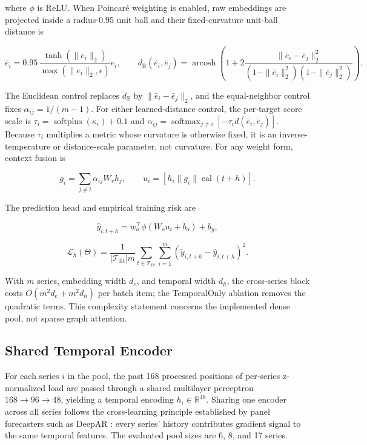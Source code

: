 \documentclass[electronics,article,submit,moreauthors]{Definitions/mdpi}
\begin{document}
where \(\phi\) is ReLU. When Poincar\'{e} weighting is enabled, raw embeddings are projected inside a radius-0.95 unit ball and their fixed-curvature unit-ball distance is

\[
\bar e_i=0.95\,\frac{\tanh(\|e_i\|_2)}{\max(\|e_i\|_2,\epsilon)}e_i,\qquad
d_{\mathbb B}(\bar e_i,\bar e_j)=
\operatorname{arcosh}\!\left(1+
2\frac{\|\bar e_i-\bar e_j\|_2^2}
{(1-\|\bar e_i\|_2^2)(1-\|\bar e_j\|_2^2)}\right).
\]

The Euclidean control replaces \(d_{\mathbb B}\) by \(\|\bar e_i-\bar e_j\|_2\), and the equal-neighbor control fixes \(\alpha_{ij}=1/(m-1)\). For either learned-distance control, the per-target score scale is \(\tau_i=\operatorname{softplus}(\kappa_i)+0.1\) and \(\alpha_{ij}=\operatorname{softmax}_{j\ne i}[-\tau_i d(\bar e_i,\bar e_j)]\). Because \(\tau_i\) multiplies a metric whose curvature is otherwise fixed, it is an inverse-temperature or distance-scale parameter, not curvature. For any weight form, context fusion is

\[
g_i=\sum_{j\ne i}\alpha_{ij}W_vh_j,\qquad
u_i=[h_i\|g_i\|\operatorname{cal}(t+h)] .
\]

The prediction head and empirical training risk are

\[
\hat y_{i,t+h}=w_o^\top\phi(W_ou_i+b_o)+b_y,
\]

\[
\mathcal L_h(\Theta)=\frac{1}{|\mathcal T_{\mathrm{fit}}|m}
\sum_{t\in\mathcal T_{\mathrm{fit}}}\sum_{i=1}^{m}
\left(\tilde y_{i,t+h}-\hat y_{i,t+h}\right)^2 .
\]

With \(m\) series, embedding width \(d_e\), and temporal width \(d_h\), the cross-series block costs \(O(m^2d_e+m^2d_h)\) per batch item; the TemporalOnly ablation removes the quadratic terms. This complexity statement concerns the implemented dense pool, not sparse graph attention.

\subsection{Shared Temporal Encoder}\label{shared-temporal-encoder}

For each series \(i\) in the pool, the past 168 processed positions of per-series z-normalized load are passed through a shared multilayer perceptron \(168 \to 96 \to 48\), yielding a temporal encoding \(h_i \in \mathbb{R}^{48}\). Sharing one encoder across all series follows the cross-learning principle established by panel forecasters such as DeepAR \cite{ref11}: every series' history contributes gradient signal to the same temporal features. The evaluated pool sizes are 6, 8, and 17 series.
\end{document}
